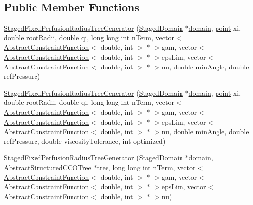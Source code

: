 \subsection*{Public Member Functions}
\begin{DoxyCompactItemize}
\item 
\hyperlink{class_staged_fixed_perfusion_radius_tree_generator_a6ec7e6bccc6335836be4b43ae5f97f7b}{Staged\+Fixed\+Perfusion\+Radius\+Tree\+Generator} (\hyperlink{class_staged_domain}{Staged\+Domain} $\ast$\hyperlink{class_staged_fixed_perfusion_radius_tree_generator_a181b53d6b220d1b589f486c0a88d5c97}{domain}, \hyperlink{structpoint}{point} xi, double root\+Radii, double qi, long long int n\+Term, vector$<$ \hyperlink{class_abstract_constraint_function}{Abstract\+Constraint\+Function}$<$ double, int $>$ $\ast$ $>$gam, vector$<$ \hyperlink{class_abstract_constraint_function}{Abstract\+Constraint\+Function}$<$ double, int $>$ $\ast$ $>$eps\+Lim, vector$<$ \hyperlink{class_abstract_constraint_function}{Abstract\+Constraint\+Function}$<$ double, int $>$ $\ast$ $>$nu, double min\+Angle, double ref\+Pressure)
\item 
\hyperlink{class_staged_fixed_perfusion_radius_tree_generator_a116dcef71e28e75ca0bfe310a85aed31}{Staged\+Fixed\+Perfusion\+Radius\+Tree\+Generator} (\hyperlink{class_staged_domain}{Staged\+Domain} $\ast$\hyperlink{class_staged_fixed_perfusion_radius_tree_generator_a181b53d6b220d1b589f486c0a88d5c97}{domain}, \hyperlink{structpoint}{point} xi, double root\+Radii, double qi, long long int n\+Term, vector$<$ \hyperlink{class_abstract_constraint_function}{Abstract\+Constraint\+Function}$<$ double, int $>$ $\ast$ $>$gam, vector$<$ \hyperlink{class_abstract_constraint_function}{Abstract\+Constraint\+Function}$<$ double, int $>$ $\ast$ $>$eps\+Lim, vector$<$ \hyperlink{class_abstract_constraint_function}{Abstract\+Constraint\+Function}$<$ double, int $>$ $\ast$ $>$nu, double min\+Angle, double ref\+Pressure, double viscosity\+Tolerance, int optimized)
\item 
\hyperlink{class_staged_fixed_perfusion_radius_tree_generator_afde1c024b2fe7d34f8ad166838837885}{Staged\+Fixed\+Perfusion\+Radius\+Tree\+Generator} (\hyperlink{class_staged_domain}{Staged\+Domain} $\ast$\hyperlink{class_staged_fixed_perfusion_radius_tree_generator_a181b53d6b220d1b589f486c0a88d5c97}{domain}, \hyperlink{class_abstract_structured_c_c_o_tree}{Abstract\+Structured\+C\+C\+O\+Tree} $\ast$\hyperlink{class_staged_fixed_perfusion_radius_tree_generator_ae07119a1095859cc74c7144ea0b87040}{tree}, long long int n\+Term, vector$<$ \hyperlink{class_abstract_constraint_function}{Abstract\+Constraint\+Function}$<$ double, int $>$ $\ast$ $>$gam, vector$<$ \hyperlink{class_abstract_constraint_function}{Abstract\+Constraint\+Function}$<$ double, int $>$ $\ast$ $>$eps\+Lim, vector$<$ \hyperlink{class_abstract_constraint_function}{Abstract\+Constraint\+Function}$<$ double, int $>$ $\ast$ $>$nu)

\end{DoxyCompactItemize}
